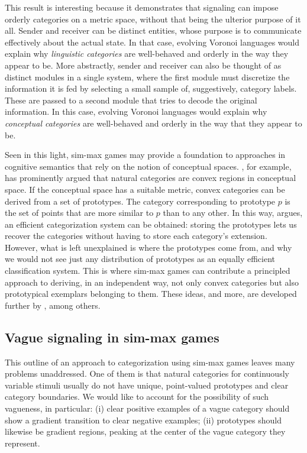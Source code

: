 \documentclass[fleqn,reqno,10pt]{article}
\begin{document}
This result is interesting because it demonstrates that signaling can
impose orderly categories on a metric space, without that being the
ulterior purpose of it all. Sender and receiver can be distinct
entities, whose purpose is to communicate effectively about the actual
state. In that case, evolving Voronoi languages would explain why
\emph{linguistic categories} are well-behaved and orderly in the way
they appear to be. More abstractly, sender and receiver can also be
thought of as distinct modules in a single system, where the first
module must discretize the information it is fed by selecting a small
sample of, suggestively, category labels. These are passed to a second
module that tries to decode the original information. In this case,
evolving Voronoi languages would explain why \emph{conceptual
  categories} are well-behaved and orderly in the way that they appear
to be.

Seen in this light, sim-max games may provide a foundation to approaches in cognitive semantics
that rely on the notion of conceptual spaces.
\citet[][70--77]{Gardenfors2000:Conceptual-Spac}, for example, has prominently argued that
natural categories are convex regions in conceptual space. If the conceptual space has a
suitable metric, convex categories can be derived from a set of prototypes. The category
corresponding to prototype $p$ is the set of points that are more similar to $p$ than to any
other. In this way, \citeauthor{Gardenfors2000:Conceptual-Spac} argues, an efficient categorization
system can be obtained: storing the prototypes lets us recover the categories without having to
store each category's extension. However, what is left unexplained is where the prototypes
come from, and why we would not see just any distribution of prototypes as an equally efficient
classification system. This is where sim-max games can contribute a principled approach to
deriving, in an independent way, not only convex categories but also prototypical exemplars
belonging to them.  These ideas, and more, are developed further by
\citet{Jager2007:The-Evolution-o,JagerRooijvan-Rooij2007:Language-Struct,JagerMetzger2011:Voronoi-Languag,OConnor2014-OCOEPC},
among others.

\subsection{Vague signaling in sim-max games}

This outline of an approach to categorization using sim-max games
leaves many problems unaddressed. One of them is that natural
categories for continuously variable stimuli usually do not have
unique, point-valued prototypes and clear category boundaries. We
would like to account for the possibility of such vagueness, in
particular: (i) clear positive examples of a vague category should
show a gradient transition to clear negative examples;
(ii) prototypes should likewise be gradient regions, peaking at the
center of the vague category they represent.
\end{document}
